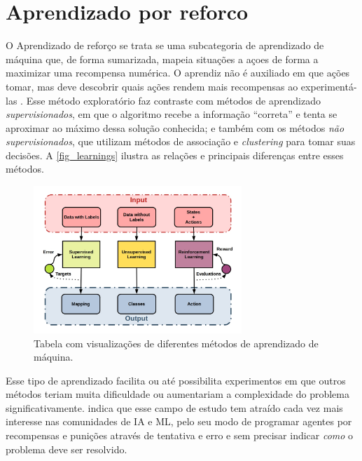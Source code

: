 \section{Aprendizado por reforco}

O Aprendizado de refor{\c c}o se trata se uma subcategoria de
aprendizado de m{\'a}quina que, de forma sumarizada, mapeia situa{\c
  c}{\~o}es a a{\c c}oes de forma a maximizar uma recompensa
num{\'e}rica. O aprendiz n{\~a}o {\'e} auxiliado em que a{\c c}{\~o}es
tomar, mas deve descobrir quais a{\c c}{\~o}es rendem mais recompensas
ao experiment{\'a}-las \cite{kaelbling1996}. Esse m{\'e}todo
explorat{\'o}rio faz contraste com m{\'e}todos de aprendizado
\textit{supervisionados}, em que o algoritmo recebe a informa{\c
  c}{\~a}o ``correta'' e tenta se aproximar ao m{\'a}ximo dessa
solu{\c c}{\~a}o conhecida; e tamb{\'e}m com os m{\'e}todos
\textit{n{\~a}o supervisionados}, que utilizam m{\'e}todos de
associa{\c c}{\~a}o e \textit{clustering} para tomar suas
decis{\~o}es. A \autoref{fig_learnings} ilustra as rela{\c c}{\~o}es e
principais diferen{\c c}as entre esses m{\'e}todos.

\begin{figure}[htb]
  \centering
  \caption{\label{fig_learnings}Tabela com visualiza{\c c}{\~o}es de diferentes m{\'e}todos de aprendizado de m{\'a}quina.}
  \includegraphics[width=0.7\textwidth]{images/unsupervised_supervised_reinforcement.jpeg}
\end{figure}


Esse tipo de aprendizado facilita ou at{\'e} possibilita experimentos
em que outros m{\'e}todos teriam muita dificuldade ou aumentariam a
complexidade do problema significativamente.
 indica que esse campo de estudo
tem atra{\'i}do cada vez mais interesse nas comunidades de IA e ML,
pelo seu modo de programar agentes por recompensas e puni{\c c}{\~o}es
atrav{\'e}s de tentativa e erro e sem precisar indicar \textit{como} o
problema deve ser resolvido.

